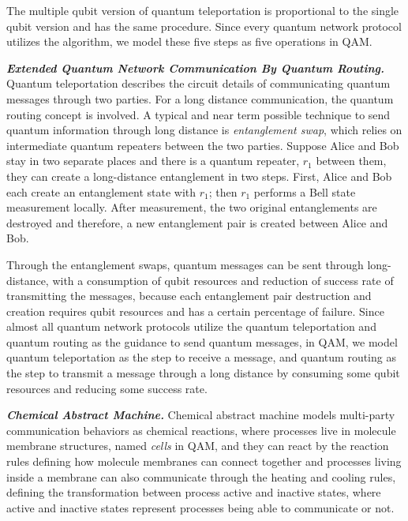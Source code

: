 The multiple qubit version of quantum teleportation \cite{Rigolin_2005} is proportional to the single qubit version
and has the same procedure.
Since every quantum network protocol utilizes the algorithm, we model these five steps as five operations in QAM.

\noindent\textbf{\textit{Extended Quantum Network Communication By Quantum Routing.}}
Quantum teleportation describes the circuit details of communicating quantum messages through two parties.
For a long distance communication, the quantum routing concept is involved.
A typical and near term possible technique to send quantum information through long distance is \textit{entanglement swap},
which relies on intermediate quantum repeaters between the two parties. Suppose Alice and Bob stay in two separate places and there is a quantum repeater, $r_1$ between them, they can create a long-distance entanglement in two steps. First, Alice and Bob each create an entanglement state with $r_1$; then $r_1$ performs a Bell state measurement locally. After measurement, the two original entanglements are destroyed and therefore, a new entanglement pair is created between Alice and Bob. 

Through the entanglement swaps, quantum messages can be sent through long-distance, with a consumption of qubit resources and reduction of success rate of transmitting the messages, because each entanglement pair destruction and creation requires qubit resources and has a certain percentage of failure. 
Since almost all quantum network protocols utilize the quantum teleportation and quantum routing as the guidance to send quantum messages, in QAM, we model quantum teleportation as the step to receive a message, and quantum routing as the step to transmit a message through a long distance by consuming some qubit resources and reducing some success rate.

\noindent\textbf{\textit{Chemical Abstract Machine.}} Chemical abstract machine \cite{BERRY1992217} models multi-party communication behaviors as chemical reactions, where processes live in molecule membrane structures, named \textit{cells} in QAM, and they can react by the reaction rules defining how molecule membranes can connect together and processes living inside a membrane can also communicate through the heating and cooling rules, 
defining the transformation between process active and inactive states, where active and inactive states represent processes being able to communicate or not.

